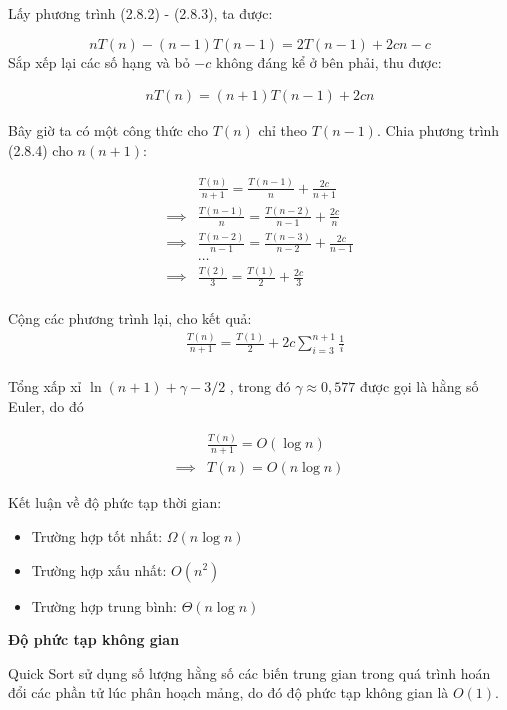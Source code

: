 Lấy phương trình (2.8.2) - (2.8.3), ta được:

$$nT(n)-(n-1)T(n-1)=2T(n-1)+2cn-c $$
Sắp xếp lại các số hạng và bỏ $-c$ không đáng kể ở bên phải, thu được: 

\begin{align*}
    nT(n)=(n+1)T(n-1)+2cn \tag{2.8.4}
\end{align*}

Bây giờ ta có một công thức cho $T(n)$ chỉ theo $T(n - 1)$. Chia phương trình (2.8.4) cho $n(n + 1)$: 

\begin{align*}
&\frac{T(n)}{n+1}=\frac{T(n-1)}{n}+\frac{2c}{n+1} \\
\implies &\frac{T(n-1)}{n}=\frac{T(n-2)}{n-1}+\frac{2c}{n} \\
\implies &\frac{T(n-2)}{n-1}=\frac{T(n-3)}{n-2}+\frac{2c}{n-1} \\
&\dots \\
\implies &\frac{T(2)}{3}=\frac{T(1)}{2}+\frac{2c}{3} \\
\end{align*}

Cộng các phương trình lại, cho kết quả:
\begin{align*}
&\frac{T(n)}{n+1}=\frac{T(1)}{2}+2c\sum_{i=3}^{n+1}\frac{1}{i} \tag{7.23} \\
\end{align*}

Tổng xấp xỉ $\ln(n + 1) + \gamma - 3/2$ , trong đó $\gamma \approx 0,577$ được gọi là hằng số Euler, do đó 

\begin{align*}
    &\frac{T(n)}{n+1}=O(\log n) \\
    \implies &T(n)=O(n \log n) 
\end{align*}


Kết luận về độ phức tạp thời gian:

 \begin{itemize}
    \item Trường hợp tốt nhất: $\Omega(n\log{n})$ 
    \item Trường hợp xấu nhất: $O(n^2)$
    \item Trường hợp trung bình: $\Theta(n\log{n})$
\end{itemize}


\textbf{Độ phức tạp không gian}

Quick Sort sử dụng số lượng hằng số các biến trung gian trong quá trình hoán đổi các phần tử lúc phân hoạch mảng, do đó độ phức tạp không gian là $O(1)$.


